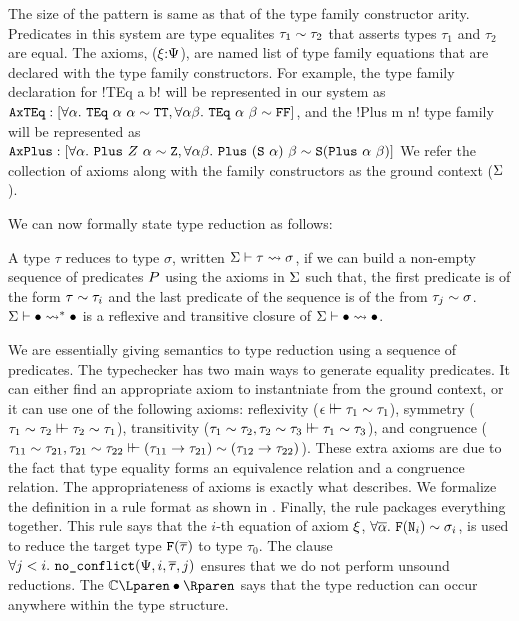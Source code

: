 \documentclass[format=acmsmall,manuscript,review,screen,nonacm,margin=1in,11pt]{acmart}
\begin{document}
The size of the pattern is same as that of the type family constructor arity.
Predicates in this system are type equalites $\tau_1\mathrel{\sim} \tau_2$ that asserts types $\tau_1$ and $\tau_2$ are equal.
The axioms, ($\xi{:}\Psi$), are named list of type family equations that are declared
with the type family constructors. For example, the type family declaration for !TEq a b! will
be represented in our system as
$\texttt{AxTEq}: [\forall\alpha.~{\texttt{TEq}~\alpha~\alpha} \mathrel{\sim} \texttt{TT}
, \forall\alpha\beta.~{\texttt{TEq}~\alpha~\beta} \mathrel{\sim} \texttt{FF}]$,
and the !Plus m n! type family will be represented as
$\texttt{AxPlus}: [\forall\alpha.~{\texttt{Plus}~Z~\alpha} \mathrel{\sim} \texttt{Z}
, \forall\alpha\beta.~{\texttt{Plus}~(\texttt{S}~\alpha)~\beta} \mathrel{\sim} \texttt{S}(\texttt{Plus}~\alpha~\beta)]$
We refer the collection of axioms along with the family constructors as the ground context ($\Sigma$).

We can now formally state type reduction as follows:
\begin{defn}\label{def:type-reduction}
  A type $\tau$ reduces to type $\sigma$, written $\Sigma \vdash \tau \rightsquigarrow \sigma$,
  if we can build a non-empty sequence of predicates $P$ using the axioms in $\Sigma$ such that,
  the first predicate is of the form $\tau\mathrel{\sim}\tau_i$ and the last predicate
  of the sequence is of the from $\tau_j\mathrel{\sim}\sigma$. $\Sigma \vdash \bullet \rightsquigarrow^* \bullet$ is a reflexive and transitive closure of $\Sigma \vdash \bullet \rightsquigarrow \bullet$.
\end{defn}
We are essentially giving semantics to type reduction using a sequence of predicates.
The typechecker has two main ways to generate
equality predicates. It can either find an appropriate axiom to instantniate from the ground context,
or it can use one of the following axioms: reflexivity ($\epsilon\vdash\hspace{-0.7ex}\vdash\tau_1\mathrel{\sim}\tau_1$),
symmetry ($\tau_1\mathrel{\sim}\tau_2 \vdash\hspace{-0.7ex}\vdash \tau_2\mathrel{\sim}\tau_1$),
transitivity ($\tau_1\mathrel{\sim}\tau_2, \tau_2\mathrel{\sim}\tau_3\vdash\hspace{-0.7ex}\vdash\tau_1\mathrel{\sim}\tau_3$),
and congruence ($\tau_{11}\mathrel{\sim}\tau_{21},\tau_{21}\mathrel{\sim}\tau_{22} \vdash\hspace{-0.7ex}\vdash(\tau_{11}\to\tau_{21})\mathrel{\sim}(\tau_{12}\to\tau_{22})$).
These extra axioms are due to the fact that type equality forms an equivalence relation and a congruence relation.
The appropriateness of axioms is exactly what  describes. We formalize the definition
in a rule format as shown in . Finally, the rule 
packages everything together. This rule says that the $i$-th equation of axiom $\xi$,
$\forall\overline{\alpha}.~\texttt{F}(\texttt{N}_i) \mathrel{\sim} \sigma_i$, is used to reduce
the target type $\texttt{F}(\overline{\tau})$ to type $\tau_0$.
The clause $\forall j < i. ~\texttt{no\_conflict}(\Psi, i, \overline{\tau}, j)$ ensures that we do not
perform unsound reductions. The $\TEvalCtxt\bullet$ says that the type reduction
can occur anywhere within the type structure. 
\end{document}
